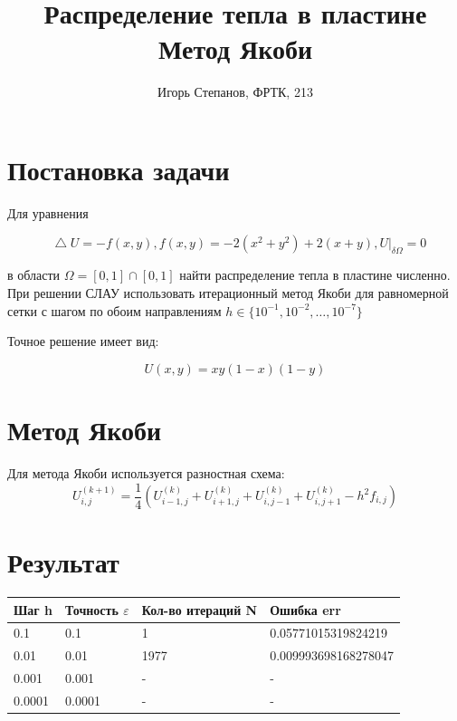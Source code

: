\documentclass[12pt,a4paper]{article}
\title{Распределение тепла в пластине \\ Метод Якоби}
\author{Игорь Степанов, ФРТК, 213}
\newcommand*\Laplace{\mathop{}\!\mathbin\bigtriangleup}
\begin{document}
\maketitle
\hrulefill

\section{Постановка задачи}
\label{sec:problem}

Для уравнения 

\begin{equation}
	\Laplace U = -f(x, y), f(x, y) = -2(x^2+y^2) + 2(x+y), U|_{\delta\Omega} = 0
\end{equation}

в области $\Omega = [0,1]\cap[0,1]$ найти распределение тепла в пластине численно. При решении СЛАУ использовать итерационный метод Якоби для равномерной сетки с шагом по обоим направлениям $h \in \{10^{-1}, 10^{-2}, \dots, 10^{-7}\} $ \par

Точное решение имеет вид:

\begin{equation}
	U(x, y) = xy(1-x)(1-y)
\end{equation}

\section{Метод Якоби}
\label{sec:yacobi}

Для метода Якоби используется разностная схема: 
\begin{equation}
	U^{(k+1)}_{i, j} = \frac{1}{4} \left(U^{(k)}_{i - 1, j} + U^{(k)}_{i + 1, j} + U^{(k)}_{i, j - 1} + U^{(k)}_{i, j + 1} - h^2 f_{i, j} \right)
\end{equation}

\section{Результат}
\label{sec:theory}

\begin{tabular}{|l|l|l|l|}

\hline
Шаг h & Точность $\varepsilon$ & Кол-во итераций N & Ошибка err \\
\hline
0.1 & 0.1 & 1 & 0.05771015319824219 \\
0.01 & 0.01 & 1977 & 0.009993698168278047 \\
0.001 & 0.001 & - & - \\
0.0001 & 0.0001 & - & - \\
\hline

\end{tabular}
\end{document}
